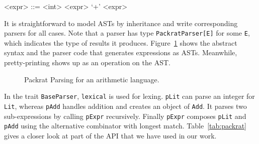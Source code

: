 \setlength{\grammarindent}{5em}
\begin{grammar}
<expr> ::= <int>
    \alt <expr> `+' <expr>
\end{grammar}

It is straightforward to model ASTs by inheritance and write corresponding parsers for all cases.
Note that a parser has type \lstinline{PackratParser[E]} for some
\lstinline{E}, which indicates the type of results it produces. Figure~\ref{fig:packrat-arith} shows the abstract syntax and
the parser code that generates expressions as ASTs. Meanwhile, pretty-printing shows up as an operation on the AST.

\begin{figure}[t]
\centering
\caption{Packrat Parsing for an arithmetic language.}\label{fig:packrat-arith}
\end{figure}


In the trait \lstinline{BaseParser}, \lstinline{lexical} is used for lexing. \lstinline{pLit} can parse an integer for \lstinline{Lit},
whereas \lstinline{pAdd} handles addition and creates an object of \lstinline{Add}. It parses two sub-expressions by calling \lstinline{pExpr}
recursively. Finally \lstinline{pExpr} composes \lstinline{pLit} and \lstinline{pAdd} using the alternative combinator with longest match.
Table~\ref{tab:packrat} gives a closer look at part of the API that we have used in our work.

